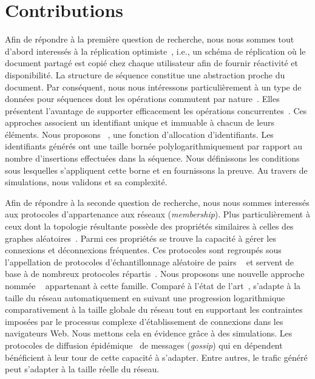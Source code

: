 
\section{Contributions}

Afin de répondre à la première question de recherche, nous nous sommes tout
d'abord interessés à la réplication optimiste~\cite{demers1987epidemic,
  saito2005optimistic}, i.e., un schéma de réplication où le document partagé
est copié chez chaque utilisateur afin de fournir réactivité et
disponibilité. La structure de séquence constitue une abstraction proche du
document. Par conséquent, nous nous intéressons particulièrement à un type de
données pour séquences dont les opérations commutent par
nature~\cite{burckhardt2014replicated, shapiro2011comprehensive,
  shapiro2011conflict, zawirski2015dependable}. Elles présentent l'avantage de
supporter efficacement les opérations concurrentes~\cite{ahmed2015evaluation,
  ahmed2011evaluating}. Ces approches associent un identifiant unique et
immuable à chacun de leurs éléments. Nous proposons
\LSEQ~\cite{nedelec2013concurrency, nedelec2013lseq}, une fonction d'allocation
d'identifiants. Les identifiants générés ont une taille bornée
polylogarithmiquement par rapport au nombre d'insertions effectuées dans la
séquence. Nous définissons les conditions sous lesquelles s'appliquent cette
borne et en fournissons la preuve. Au travers de simulations, nous validons
\LSEQ et sa complexité.

Afin de répondre à la seconde question de recherche, nous nous sommes interessés
aux protocoles d'appartenance aux réseaux (\emph{membership}). Plus
particulièrement à ceux dont la topologie résultante possède des propriétés
similaires à celles des graphes aléatoires~\cite{erdos1959random}. Parmi ces
propriétés se trouve la capacité à gérer les connexions et déconnexions
fréquentes. Ces protocoles sont regroupés sous l'appellation de \og protocoles
d'échantillonnage aléatoire de pairs \fg~\cite{jelasity2004peer,
  jelasity2007gossip} et servent de base à de nombreux protocoles
répartis~\cite{dabek2004vivaldi, folz2016cyclades, montresor2005chord}. Nous
proposons une nouvelle approche nommée \SPRAY~\cite{nedelec2015spray}
appartenant à cette famille. Comparé à l'état de
l'art~\cite{eugster2003lightweight, ganesh2001scamp, jelasity2007gossip,
  leitao2007dependable, tolgyeski2009adaptive, voulgaris2005cyclon}, \SPRAY
s'adapte à la taille du réseau automatiquement en suivant une progression
logarithmique comparativement à la taille globale du réseau tout en supportant
les contraintes imposées par le processus complexe d'établissement de connexions
dans les navigateurs Web. Nous mettons cela en évidence grâce à des simulations.
Les protocoles de diffusion épidémique~\cite{birman1999bimodal} de messages
(\emph{gossip}) qui en dépendent bénéficient à leur tour de cette capacité à
s'adapter. Entre autres, le trafic généré peut s'adapter à la taille réelle du
réseau.

